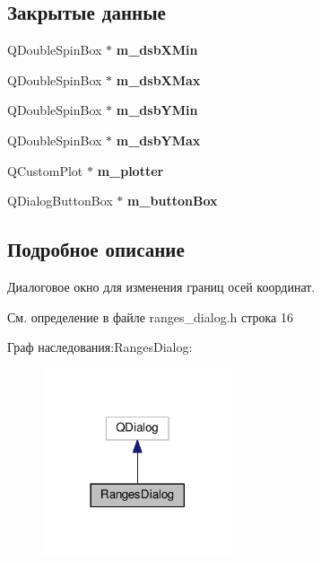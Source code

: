 \subsection*{Закрытые данные}
\begin{DoxyCompactItemize}
\item 
Q\+Double\+Spin\+Box $\ast$ {\bfseries m\+\_\+dsb\+X\+Min}\hypertarget{class_ranges_dialog_aa7e90336b7f703eda2d04b74cc29b1f1}{}\label{class_ranges_dialog_aa7e90336b7f703eda2d04b74cc29b1f1}

\item 
Q\+Double\+Spin\+Box $\ast$ {\bfseries m\+\_\+dsb\+X\+Max}\hypertarget{class_ranges_dialog_a336a353a6730dc45cbac777808b6c368}{}\label{class_ranges_dialog_a336a353a6730dc45cbac777808b6c368}

\item 
Q\+Double\+Spin\+Box $\ast$ {\bfseries m\+\_\+dsb\+Y\+Min}\hypertarget{class_ranges_dialog_a5ca6eae82b600f510d7e0e45bd0c254a}{}\label{class_ranges_dialog_a5ca6eae82b600f510d7e0e45bd0c254a}

\item 
Q\+Double\+Spin\+Box $\ast$ {\bfseries m\+\_\+dsb\+Y\+Max}\hypertarget{class_ranges_dialog_a2b993d1980494d1dcd45a9f432c04c39}{}\label{class_ranges_dialog_a2b993d1980494d1dcd45a9f432c04c39}

\item 
Q\+Custom\+Plot $\ast$ {\bfseries m\+\_\+plotter}\hypertarget{class_ranges_dialog_a68fd573fcf8e4c35716edca9b983ee16}{}\label{class_ranges_dialog_a68fd573fcf8e4c35716edca9b983ee16}

\item 
Q\+Dialog\+Button\+Box $\ast$ {\bfseries m\+\_\+button\+Box}\hypertarget{class_ranges_dialog_abd076dcdfac169f18d61b361478fa523}{}\label{class_ranges_dialog_abd076dcdfac169f18d61b361478fa523}

\end{DoxyCompactItemize}


\subsection{Подробное описание}
Диалоговое окно для изменения границ осей координат. 

См. определение в файле ranges\+\_\+dialog.\+h строка 16



Граф наследования\+:Ranges\+Dialog\+:
\nopagebreak
\begin{figure}[H]
\begin{center}
\leavevmode
\includegraphics[width=158pt]{class_ranges_dialog__inherit__graph}
\end{center}
\end{figure}


